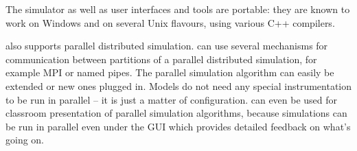 The simulator as well as user interfaces and tools are portable:
they are known to work on Windows and on several Unix flavours,
using various C++ compilers.

{\opp} also supports parallel distributed simulation. {\opp} can
use several mechanisms for communication between partitions of
a parallel distributed simulation, for example MPI or named pipes.
The parallel simulation algorithm can easily be extended or new
ones plugged in. Models do not need any special instrumentation
to be run in parallel -- it is just a matter of configuration.
{\opp} can even be used for classroom presentation of parallel
simulation algorithms, because simulations can be run in parallel
even under the GUI which provides detailed feedback on what's going on.




